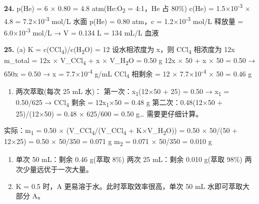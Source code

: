 \documentclass[a4paper,11pt]{ctexart}
\providecommand{\tightlist}{\setlength{\itemsep}{0pt}\setlength{\parskip}{0pt}}
\begin{document}
\textbf{24.} p(He) = 6 × 0.80 = 4.8 atm(He:O\textsubscript{2} = 4:1，He 占 80\%)
c(He) = 1.5×10\textsuperscript{-3} × 4.8 = 7.2×10\textsuperscript{-3} mol/L
水面 p(He) = 0.80 atm，c = 1.2×10\textsuperscript{-3} mol/L
释放量 = 6.0×10\textsuperscript{-3} mol/L → V = 0.134 L = 134 mL/L 血液

\textbf{25.}
(a) K = c(CCl\textsubscript{4})/c(H\textsubscript{2}O) = 12
设水相浓度为 x，则 CCl\textsubscript{4} 相浓度为 12x
m\_total = 12x × V\_CCl\textsubscript{4} + x × V\_H\textsubscript{2}O = 0.50 g
12x × 50 + x × 50 = 0.50 → 650x = 0.50 → x = 7.7×10\textsuperscript{-4} g/mL
CCl\textsubscript{4} 相剩余 = 12 × 7.7×10\textsuperscript{-4} × 50 = 0.46 g

\begin{enumerate}
\def\labelenumi{(\alph{enumi})}
\setcounter{enumi}{1}
\tightlist
\item
  两次萃取(每次 25 mL 水)：
  第一次：x\textsubscript{1}(12×50 + 25) = 0.50 → x\textsubscript{1} = 0.50/625 → CCl\textsubscript{4} 剩余 = 12x\textsubscript{1}×50 = 0.48 g
  第二次：0.48(12×50 + 25)/(12×50) = 0.48 × 625/600 = 0.50 g\ldots{} 需要更仔细计算。
\end{enumerate}

实际：m\textsubscript{1} = 0.50 × (V\_CCl\textsubscript{4}/(V\_CCl\textsubscript{4} + K×V\_H\textsubscript{2}O)) = 0.50 × 50/(50 + 12×25) = 0.50 × 50/350 = 0.071 g
m\textsubscript{2} = 0.071 × 50/350 = 0.010 g

\begin{enumerate}
\def\labelenumi{(\alph{enumi})}
\setcounter{enumi}{2}
\item
  单次 50 mL：剩余 0.46 g(萃取 8\%)
  两次 25 mL：剩余 0.010 g(萃取 98\%)
  两次少量远优于一次大量。
\item
  K = 0.5 时，A 更易溶于水。此时萃取效率很高，单次 50 mL 水即可萃取大部分 A。
\end{enumerate}
\end{document}
